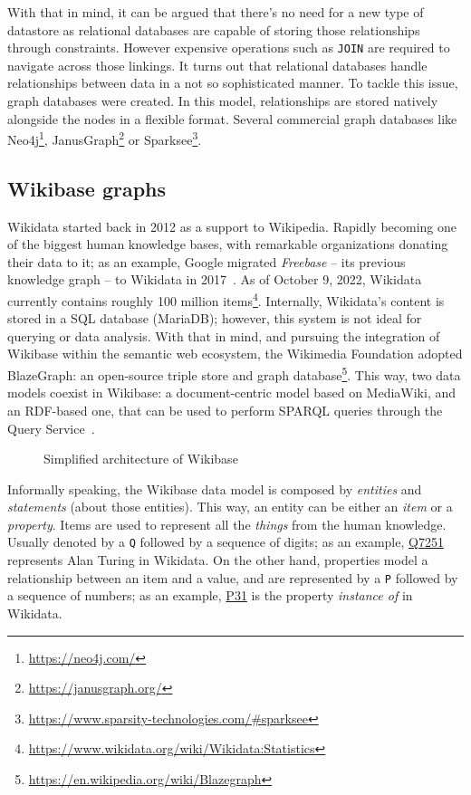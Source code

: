 With that in mind, it can be argued that there's no need for a new type of datastore as relational databases are capable of storing those relationships through constraints. However expensive operations such as \texttt{JOIN} are required to navigate across those linkings. It turns out that relational databases handle relationships between data in a not so sophisticated manner. To tackle this issue, graph databases were created. In this model, relationships are stored natively alongside the nodes in a flexible format. Several commercial graph databases like Neo4j\footnote{\url{https://neo4j.com/}}, JanusGraph\footnote{\url{https://janusgraph.org/}} or Sparksee\footnote{\url{https://www.sparsity-technologies.com/\#sparksee}}.

\subsection{Wikibase graphs}

Wikidata started back in 2012 as a support to Wikipedia. Rapidly becoming one of the biggest human knowledge bases, with remarkable organizations donating their data to it; as an example, Google migrated \textit{Freebase} -- its previous knowledge graph -- to Wikidata in 2017~\cite{10.1145/2872427.2874809}. As of October 9, 2022, Wikidata currently contains roughly 100 million items\footnote{\url{https://www.wikidata.org/wiki/Wikidata:Statistics}}. Internally, Wikidata's content is stored in a SQL database (MariaDB); however, this system is not ideal for querying or data analysis. With that in mind, and pursuing the integration of Wikibase within the semantic web ecosystem, the Wikimedia Foundation adopted BlazeGraph: an open-source triple store and graph database\footnote{\url{https://en.wikipedia.org/wiki/Blazegraph}}. This way, two data models coexist in Wikibase: a document-centric model based on MediaWiki, and an RDF-based one, that can be used to perform SPARQL queries through the Query Service~\cite{https://doi.org/10.48550/arxiv.2110.11709}.

\begin{figure}[ht]
    \centering
    
    \caption[Simplified architecture of Wikibase]{Simplified architecture of Wikibase~\cite{https://doi.org/10.48550/arxiv.2110.11709}}
    \label{fig:architecture:wikibase}
\end{figure}

Informally speaking, the Wikibase data model is composed by \textit{entities} and \textit{statements} (about those entities). This way, an entity can be either an \textit{item} or a \textit{property}. Items are used to represent all the \textit{things} from the human knowledge. Usually denoted by a \texttt{Q} followed by a sequence of digits; as an example, \href{https://www.wikidata.org/wiki/Q7251}{Q7251} represents Alan Turing in Wikidata. On the other hand, properties model a relationship between an item and a value, and are represented by a \texttt{P} followed by a sequence of numbers; as an example, \href{https://www.wikidata.org/wiki/Property:P31}{P31} is the property \textit{instance of} in Wikidata.

